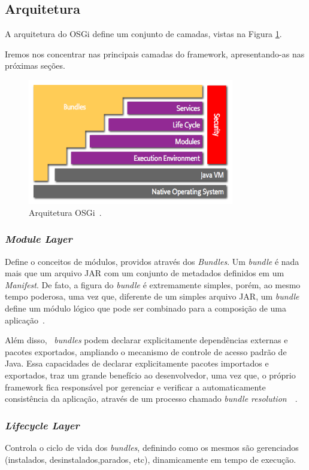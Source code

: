 \subsection{Arquitetura}

A arquitetura do OSGi define um conjunto de camadas, vistas na Figura \ref{fig:arch_osgi}. 

Iremos nos concentrar nas principais camadas do framework, apresentando-as nas próximas seções.

\begin{figure}[htp]
\centering
\includegraphics[width=9cm]{chapters/chapter2/arch-osgi.png}
\caption[Arquitetura OSGi]{Arquitetura OSGi~\cite{osgiorg}.}
\label{fig:arch_osgi}
\end{figure}


\subsubsection{\textit{Module Layer}}
Define o conceitos de módulos, providos através dos \textit{Bundles}. Um \textit{bundle} é nada mais que um arquivo JAR com um conjunto de metadados definidos em um \textit{Manifest}. De fato, a figura do \textit{bundle} é extremamente simples, porém, ao mesmo tempo poderosa, uma vez que, diferente de um simples arquivo JAR, um \textit{bundle} define um módulo lógico que pode ser combinado para a composição de uma aplicação~\cite{hall2010osgi}.

Além disso, ~\textit{bundles} podem declarar explicitamente dependências externas e pacotes exportados, ampliando o mecanismo de controle de acesso padrão de Java. Essa capacidades de declarar explicitamente pacotes importados e exportados, traz um grande benefício ao desenvolvedor, uma vez que, o próprio framework fica responsável por gerenciar e verificar a automaticamente consistência da aplicação, através de um processo chamado \textit{bundle resolution}~\cite{hall2010osgi}~\cite{osgiorg}.

\subsubsection{\textit{Lifecycle Layer}}
Controla o ciclo de vida dos \textit{bundles}, definindo como os mesmos são gerenciados (instalados, desinstalados,parados, etc), dinamicamente em tempo de execução.

